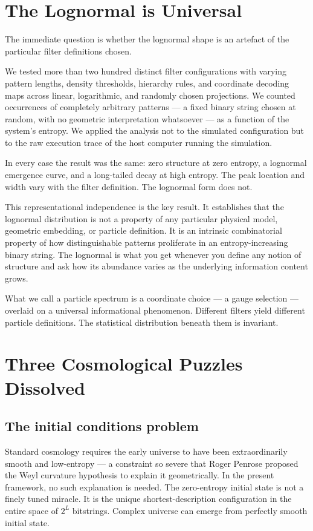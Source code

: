 \section{The Lognormal is Universal}

The immediate question is whether the lognormal shape is an artefact of
the particular filter definitions chosen. 

We tested more than two hundred distinct filter configurations with varying
pattern lengths, density thresholds, hierarchy rules, and
coordinate decoding maps across linear, logarithmic, and randomly chosen
projections. We counted occurrences of completely arbitrary patterns ---
a fixed binary string chosen at random, with no geometric interpretation
whatsoever --- as a function of the system's entropy. We applied the
analysis not to the simulated configuration but to the raw execution
trace of the host computer running the simulation.

In every case the result was the same: zero structure at zero entropy, a
lognormal emergence curve, and a long-tailed decay at high entropy. The
peak location and width vary with the filter definition. The lognormal
form does not.

This representational independence is the key result. It establishes
that the lognormal distribution is not a property of any particular
physical model, geometric embedding, or particle definition. It is an
intrinsic combinatorial property of how distinguishable patterns
proliferate in an entropy-increasing binary string. The lognormal is
what you get whenever you define any notion of structure and ask how
its abundance varies as the underlying information content grows.

What we call a particle spectrum is a coordinate choice --- a gauge
selection --- overlaid on a universal informational phenomenon. Different
filters yield different particle definitions. The statistical distribution
beneath them is invariant.

\section{Three Cosmological Puzzles Dissolved}

\subsection*{The initial conditions problem}

Standard cosmology requires the early universe to have been
extraordinarily smooth and low-entropy --- a constraint so severe that
Roger Penrose proposed the Weyl curvature hypothesis to explain it
geometrically. In the present framework, no such explanation is needed.
The zero-entropy initial state is not a finely tuned miracle. It is the
unique shortest-description configuration in the entire space of $2^L$
bitstrings. Complex universe can emerge from perfectly smooth initial state.

